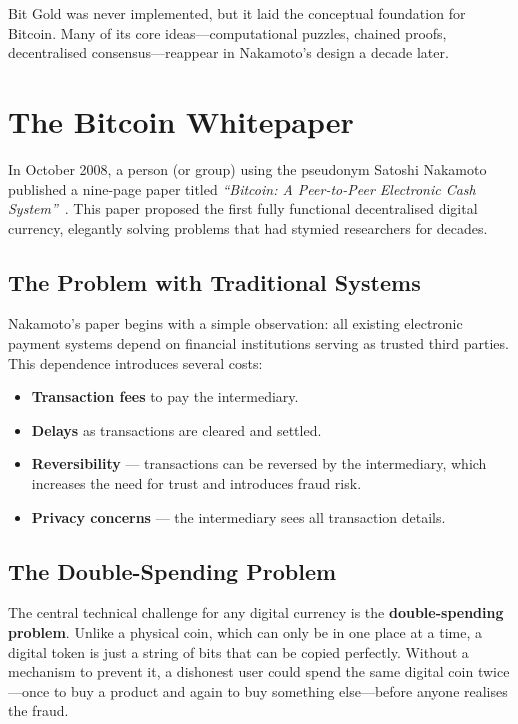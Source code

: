 Bit Gold was never implemented, but it laid the conceptual foundation for Bitcoin. Many of its core ideas---computational puzzles, chained proofs, decentralised consensus---reappear in Nakamoto's design a decade later.


\section{The Bitcoin Whitepaper}
\label{sec:bitcoin-wp}

In October 2008, a person (or group) using the pseudonym Satoshi Nakamoto published a nine-page paper titled \emph{``Bitcoin: A Peer-to-Peer Electronic Cash System''}~\cite{nakamoto2008bitcoin}. This paper proposed the first fully functional decentralised digital currency, elegantly solving problems that had stymied researchers for decades.

\subsection{The Problem with Traditional Systems}

Nakamoto's paper begins with a simple observation: all existing electronic payment systems depend on financial institutions serving as trusted third parties. This dependence introduces several costs:
\begin{itemize}
    \item \textbf{Transaction fees} to pay the intermediary.
    \item \textbf{Delays} as transactions are cleared and settled.
    \item \textbf{Reversibility} --- transactions can be reversed by the intermediary, which increases the need for trust and introduces fraud risk.
    \item \textbf{Privacy concerns} --- the intermediary sees all transaction details.
\end{itemize}

\subsection{The Double-Spending Problem}
\label{sec:double-spend}

The central technical challenge for any digital currency is the \textbf{double-spending problem}. Unlike a physical coin, which can only be in one place at a time, a digital token is just a string of bits that can be copied perfectly. Without a mechanism to prevent it, a dishonest user could spend the same digital coin twice---once to buy a product and again to buy something else---before anyone realises the fraud.

